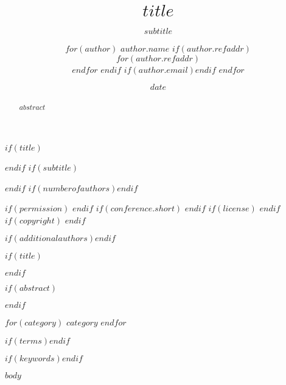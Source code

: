 \documentclass[$if(fontsize)$$fontsize$,$endif$$if(lang)$$lang$,$endif$$if(papersize)$$papersize$,$endif$]{acm_proc_article-sp}
\begin{document}
$if(title)$\title{$title$}$endif$
$if(subtitle)$\subtitle{$subtitle$}$endif$
$if(numberofauthors)$$endif$

\author{
$for(author)$
  \alignauthor 
  $author.name$
  $if(author.refaddr)$
    \\
    $for(author.refaddr)$
      \\
    $endfor$
  $endif$
  $if(author.email)$$endif$
$endfor$
}

$if(permission)$
$endif$
$if(conference.short)$
$endif$
$if(license)$
$endif$
$if(copyright)$
$endif$

$if(additionalauthors)$$endif$

\date{$date$}

$if(title)$\maketitle$endif$

$if(abstract)$
\begin{abstract}
$abstract$
\end{abstract}
$endif$

$for(category)$
$category$
$endfor$

$if(terms)$$endif$

$if(keywords)$$endif$

$body$
\end{document}
